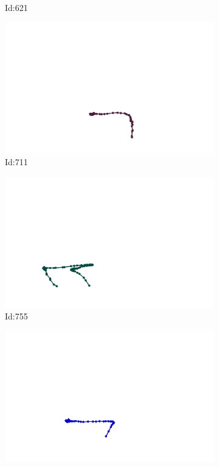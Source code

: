 \documentclass[12pt,twoside]{report}
\begin{document}
\begin{figure}
\begin{subfigure}[b]{0.20\textwidth}
\caption{Id:621}
\end{subfigure}
\begin{subfigure}[b]{0.20\textwidth}
\centering
\includegraphics[width=\textwidth]{../trajectories/711.png}
\caption{Id:711}
\end{subfigure}
\begin{subfigure}[b]{0.20\textwidth}
\centering
\includegraphics[width=\textwidth]{../trajectories/755.png}
\caption{Id:755}
\end{subfigure}
\begin{subfigure}[b]{0.20\textwidth}
\centering
\includegraphics[width=\textwidth]{../trajectories/756.png}

\end{subfigure}
\end{figure}
\end{document}

